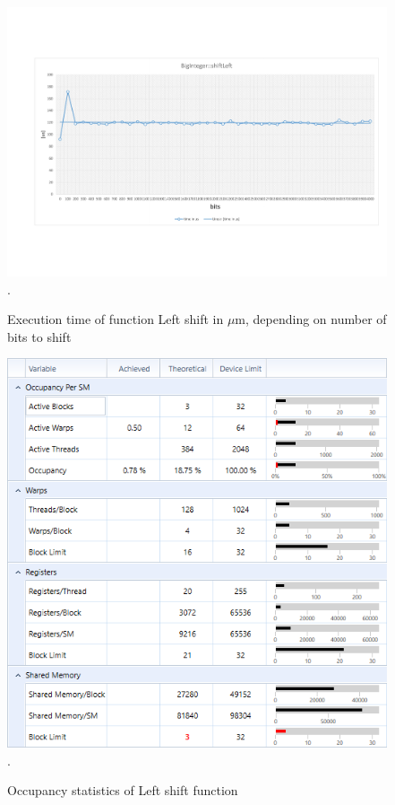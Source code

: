 \documentclass[oneside,openright,12pt,final,en]{mgr}
\begin{document}
\begin{figure}[H]
	\centering
	\includegraphics[width=\textwidth,trim={0.5cm 2.8cm 0.4cm 2.8cm},clip]{leftshift.pdf}.
	\caption{Execution time of function Left shift in $\mu$m, depending on number of bits to shift}
	\label{fig:leftshift}
\end{figure}

\begin{figure}[H]
	\centering
	\includegraphics[width=\textwidth]{leftshift_occupancy}.
	\caption{Occupancy statistics of Left shift function}
	\label{fig:leftshift_occupancy}
\end{figure}
\end{document}

